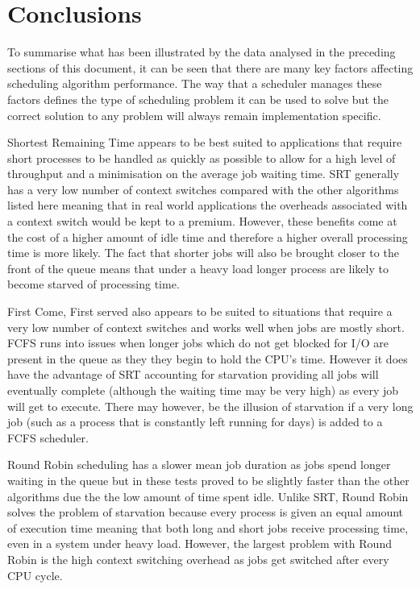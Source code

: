 \documentclass{acm_proc_article-sp}
\begin{document}
\section{Conclusions}
To summarise what has been illustrated by the data analysed in the preceding sections of this document, it can be seen that there are many key factors affecting scheduling algorithm performance. The way that a scheduler manages these factors defines the type of scheduling problem it can be used to solve but the correct solution to any problem will always remain implementation specific.

Shortest Remaining Time appears to be best suited to applications that require short processes to be handled as quickly as possible to allow for a high level of throughput and a minimisation on the average job waiting time. SRT generally has a very low number of context switches compared with the other algorithms listed here meaning that in real world applications the overheads associated with a context switch would be kept to a premium. However, these benefits come at the cost of a higher amount of idle time and therefore a higher overall processing time is more likely. The fact that shorter jobs will also be brought closer to the front of the queue means that under a heavy load longer process are likely to become starved of processing time.

First Come, First served also appears to be suited to situations that require a very low number of context switches and works well when jobs are mostly short. FCFS runs into issues when longer jobs which do not get blocked for I/O are present in the queue as they they begin to hold the CPU's time. However it does have the advantage of SRT accounting for starvation providing all jobs will eventually complete (although the waiting time may be very high) as every job will get to execute. There may however, be the illusion of starvation if a very long job (such as a process that is constantly left running for days) is added to a FCFS scheduler.

Round Robin scheduling has a slower mean job duration as jobs spend longer waiting in the queue but in these tests proved to be slightly faster than the other algorithms due the the low amount of time spent idle. Unlike SRT, Round Robin solves the problem of starvation because every process is given an equal amount of execution time meaning that both long and short jobs receive processing time, even in a system under heavy load. However, the largest problem with Round Robin is the high context switching overhead as jobs get switched after every CPU cycle.
\end{document}
